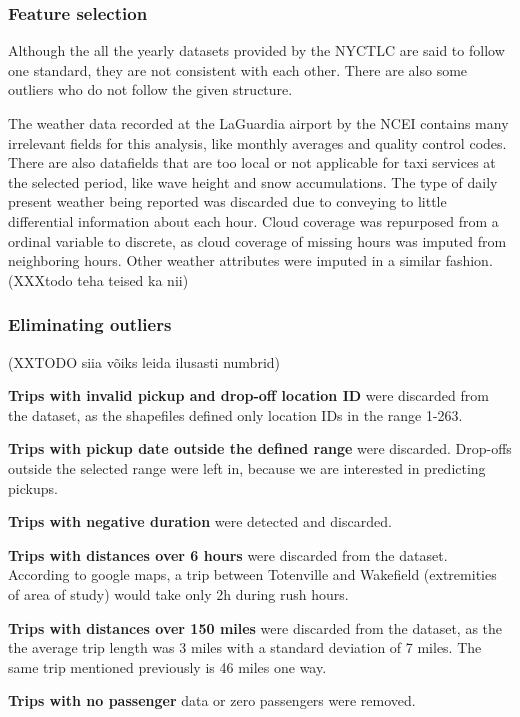 \documentclass[11pt]{article}
\begin{document}
\subsubsection{Feature selection}

Although the all the yearly datasets provided by the NYCTLC are said to follow one standard, they are not consistent with each other. There are also some outliers who do not follow the given structure. 

The weather data recorded at the LaGuardia airport by the NCEI \cite{weatherDataGuide} contains many irrelevant fields for this analysis, like monthly averages and quality control codes. There are also datafields that are too local or not applicable for taxi services at the selected period, like wave height and snow accumulations. The type of daily present weather being reported was discarded due to conveying to little differential information about each hour. Cloud coverage was repurposed from a ordinal variable to discrete, as cloud coverage of missing hours was imputed from neighboring hours. Other weather attributes were imputed in a similar fashion.(XXXtodo teha teised ka nii)

\subsubsection{Eliminating outliers}

(XXTODO siia võiks leida ilusasti numbrid)

\textbf{Trips with invalid pickup and drop-off location ID} were discarded from the dataset, as the shapefiles defined only location IDs in the range 1-263.

\textbf{Trips with pickup date outside the defined range} were discarded. Drop-offs outside the selected range were left in, because we are interested in predicting pickups.

\textbf{Trips with negative duration} were detected and discarded.

\textbf{Trips with distances over 6 hours} were discarded from the dataset. According to google maps, a trip between Totenville and Wakefield (extremities of area of study) would take only 2h during rush hours.

\textbf{Trips with distances over 150 miles} were discarded from the dataset, as the the average trip length was 3 miles with a standard deviation of 7 miles. The same trip mentioned previously is 46 miles one way.

\textbf{Trips with no passenger} data or zero passengers were removed.
\end{document}
